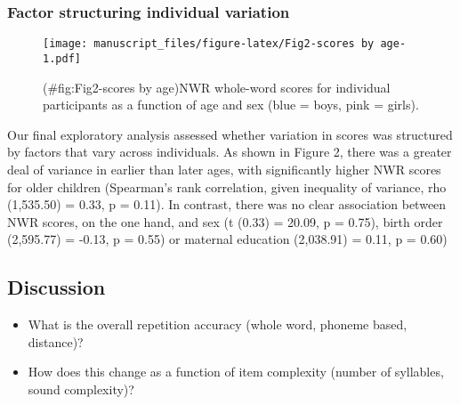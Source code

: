 \documentclass[english,,man,floatsintext]{apa6}
\begin{document}
\hypertarget{factor-structuring-individual-variation}{%
\subsubsection{Factor structuring individual variation}\label{factor-structuring-individual-variation}}

\begin{figure}
\centering
\texttt{[image: manuscript\_files/figure-latex/Fig2-scores by age-1.pdf]}
\caption{(\#fig:Fig2-scores by age)NWR whole-word scores for individual participants as a function of age and sex (blue = boys, pink = girls).}
\end{figure}

Our final exploratory analysis assessed whether variation in scores was structured by factors that vary across individuals. As shown in Figure 2, there was a greater deal of variance in earlier than later ages, with significantly higher NWR scores for older children (Spearman's rank correlation, given inequality of variance, rho (1,535.50) = 0.33, p = 0.11). In contrast, there was no clear association between NWR scores, on the one hand, and sex (t (0.33) = 20.09, p = 0.75), birth order (2,595.77) = -0.13, p = 0.55) or maternal education (2,038.91) = 0.11, p = 0.60)

\hypertarget{discussion}{%
\subsection{Discussion}\label{discussion}}

\begin{itemize}
\item
  What is the overall repetition accuracy (whole word, phoneme based, distance)?
\item
  How does this change as a function of item complexity (number of syllables, sound complexity)?
\end{itemize}
\end{document}
